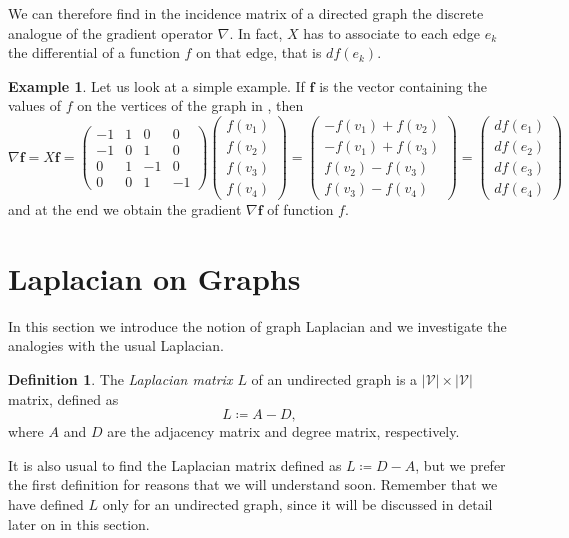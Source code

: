 \documentclass[12pt,a4paper]{report}
\theoremstyle{definition}
\newtheorem{definition}{Definition}[chapter]
\newtheorem{example}{Example}[chapter]
\begin{document}
We can therefore find in the incidence matrix of a directed graph the discrete analogue of the gradient operator $\nabla$.
In fact, $X$ has to associate to each edge $e_{k}$ the differential of a function $f$ on that edge, that is $df(e_{k})$.
\begin{example}
Let us look at a simple example.
If $\textbf{f}$ is the vector containing the values of $f$ on the vertices of the graph in , then 
\begin{equation*}
    \nabla \mathbf{f} = X \mathbf{f} = 
    \begin{pmatrix}
    -1 & 1 & 0 & 0 \\
    -1 & 0 & 1 & 0 \\
    0 & 1 & -1 & 0 \\
    0 & 0 & 1 & -1 
    \end{pmatrix}
    \begin{pmatrix}
    f(v_1) \\
    f(v_2) \\
    f(v_3) \\
    f(v_4) 
    \end{pmatrix} = 
    \begin{pmatrix}
    - f(v_1) + f(v_2) \\
    - f(v_1) + f(v_3) \\
    f(v_2) - f(v_3) \\
    f(v_3) - f(v_4)
    \end{pmatrix} = 
    \begin{pmatrix}
    df(e_{1}) \\
    df(e_{2}) \\
    df(e_{3}) \\
    df(e_{4}) 
    \end{pmatrix}
\end{equation*}
and at the end we obtain the gradient $\nabla \textbf{f}$ of function $f$.
\end{example}


\section{Laplacian on Graphs}
\label{sec:laplacian}

In this section we introduce the notion of graph Laplacian and we investigate the analogies with the usual Laplacian.
\begin{definition}
\label{def:laplacian}
The \emph{Laplacian matrix $L$} of an undirected graph is a $|\mathcal{V}| \times |\mathcal{V}|$ matrix, defined as
\begin{equation*}
    L \coloneqq A - D,
\end{equation*}
where $A$ and $D$ are the adjacency matrix and degree matrix, respectively.
\end{definition}
It is also usual to find the Laplacian matrix defined as $L \coloneqq D - A$, but we prefer the first definition for reasons that we will understand soon.
Remember that we have defined $L$ only for an undirected graph, since it will be discussed in detail later on in this section.
\end{document}
